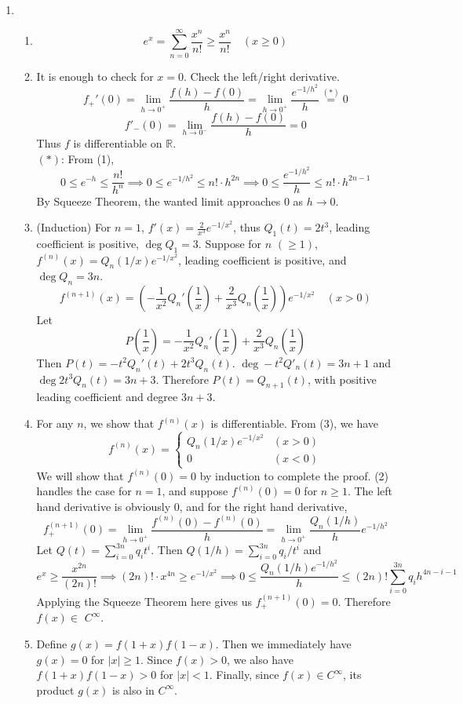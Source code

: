 \documentclass[11pt]{report}
\newcommand{\ra}{\rightarrow}
\newcommand{\abs}[1]{\left|#1\right|}
\newcommand{\imp}{\implies}
\newcommand{\R}{\mathbb{R}}
\begin{document}
\begin{enumerate}
\item 
\begin{enumerate}
	\item $$e^x = \sum_{n=0}^\infty \frac{x^n}{n!} \geq \frac{x^n}{n!} \quad (x \geq 0)$$ 
	\item It is enough to check for $x= 0$. Check the left/right derivative.
	$$f_+'(0) = \lim_{h\ra0^+} \frac{f(h) - f(0)}{h} = \lim_{h\ra0^+} \frac{e^{-1/h^2}}{h} \overset{(*)}{=} 0$$
	$$f'_-(0) = \lim_{h\ra0^-}\frac{f(h)-f(0)}{h} = 0$$
	Thus $f$ is differentiable on $\R$.\\
	$(*)$: From (1), $$0\leq e^{-h} \leq \frac{n!}{h^n} \imp 0\leq e^{-1/h^2} \leq n!\cdot h^{2n} \imp 0\leq \frac{e^{-1/h^2}}{h} \leq n!\cdot h^{2n-1}$$
	By Squeeze Theorem, the wanted limit approaches 0 as $h\ra 0$.
	\item (Induction) For $n =1$, $f'(x) = \frac{2}{x^3}e^{-1/x^2}$, thus $Q_1(t) = 2t^3$, leading coefficient is positive, $\deg Q_1 = 3$.
	Suppose for $n$ $(\geq 1)$, $f^{(n)}(x) = Q_n(1/x)e^{-1/x^2}$, leading coefficient is positive, and $\deg Q_n = 3n$.
	$$f^{(n+1)}(x) = \left(-\frac{1}{x^2} Q_n'\left(\frac{1}{x}\right) +\frac{2}{x^3} Q_n\left(\frac{1}{x}\right)\right)e^{-1/x^2} \quad (x>0)$$
	Let $$P\left(\frac{1}{x}\right) = -\frac{1}{x^2} Q_n'\left(\frac{1}{x}\right) +\frac{2}{x^3} Q_n\left(\frac{1}{x}\right)$$
	Then $P(t) = -t^2 Q_n'(t) + 2t^3 Q_n(t)$. $\deg -t^2 Q'_n(t) = 3n+1$ and $\deg 2t^3 Q_n(t) = 3n+3$. Therefore $P(t) = Q_{n+1}(t)$, with positive leading coefficient and degree $3n+3$.
	\item For any $n$, we show that $f^{(n)}(x)$ is differentiable. From (3), we have
	$$f^{(n)}(x) = \begin{cases}
		Q_n(1/x)e^{-1/x^2} & (x > 0) \\ 0 & ( x < 0)
	\end{cases}$$
	We will show that $f^{(n)}(0) = 0$ by induction to complete the proof. (2) handles the case for $n=1$, and suppose $f^{(n)}(0) = 0$ for $n \geq 1$. The left hand derivative is obviously 0, and for the right hand derivative,
	$$f_+^{(n+1)}(0) = \lim_{h\ra0^+} \frac{f^{(n)}(0) - f^{(n)}(0)}{h} = \lim_{h\ra0^+} \frac{Q_n(1/h)}{h}e^{-1/h^2}$$
	Let $Q(t) = \sum_{i=0}^{3n} q_i t^i$. Then $Q(1/h) = \sum_{i=0}^{3n} q_i/t^i$ and
	$$e^{x} \geq \frac{x^{2n}}{(2n)!} \imp (2n)!\cdot x^{4n} \geq e^{-1/x^2}
	\imp 0 \leq \frac{Q_n(1/h)e^{-1/h^2}}{h} \leq (2n)! \sum_{i=0}^{3n} q_i h^{4n-i-1}$$
	Applying the Squeeze Theorem here gives us $f_+^{(n+1)}(0) =0$. Therefore $f(x) \in$ $C^\infty$.
	\item Define $g(x) = f(1+x)f(1-x)$. Then we immediately have $g(x) = 0$ for $\abs{x}\geq 1$. Since $f(x) > 0$, we also have $f(1+x)f(1-x) > 0$ for $\abs{x} < 1$. Finally, since $f(x)\in C^\infty$, its product $g(x)$ is also in $C^\infty$.
\end{enumerate}


\end{enumerate}
\end{document}
